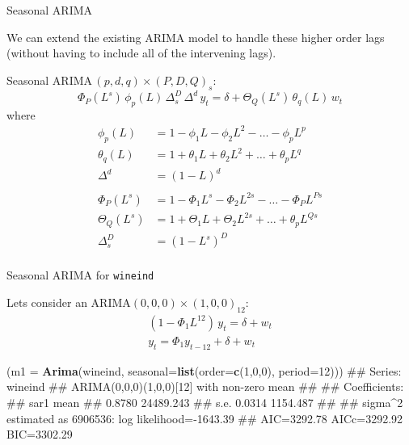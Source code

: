 \documentclass[11pt,ignorenonframetext,]{beamer}
\newenvironment{Shaded}{}{}
\newcommand{\KeywordTok}[1]{\textcolor[rgb]{0.00,0.44,0.13}{\textbf{#1}}}
\newcommand{\DataTypeTok}[1]{\textcolor[rgb]{0.56,0.13,0.00}{#1}}
\newcommand{\DecValTok}[1]{\textcolor[rgb]{0.25,0.63,0.44}{#1}}
\newcommand{\NormalTok}[1]{#1}
\let\oldShaded\Shaded
\let\endoldShaded\endShaded
\renewenvironment{Shaded}{\footnotesize\begin{spacing}{0.9}\oldShaded}{\endoldShaded\end{spacing}}
\begin{document}
\begin{frame}[t]{Seasonal ARIMA}

We can extend the existing ARIMA model to handle these higher order lags
(without having to include all of the intervening lags).

\vspace{3mm}

Seasonal \(\text{ARIMA}\,(p,d,q) \times (P,D,Q)_s\):
\[ \Phi_P(L^s) \, \phi_p(L) \, \Delta_s^D \, \Delta^d \, y_t = \delta + \Theta_Q(L^s) \, \theta_q(L) \, w_t\]
\pause where \[
\begin{aligned}
\phi_p(L) &= 1-\phi_1 L - \phi_2 L^2 - \ldots - \phi_p L^p\\
\theta_q(L) &= 1+\theta_1 L + \theta_2 L^2 + \ldots + \theta_p L^q \\
\Delta^d &= (1-L)^d\\
\\
\Phi_P(L^s) &= 1-\Phi_1 L^s - \Phi_2 L^{2s} - \ldots - \Phi_P L^{Ps} \\
\Theta_Q(L^s) &= 1+\Theta_1 L + \Theta_2 L^{2s} + \ldots + \theta_p L^{Qs} \\
\Delta_s^D &= (1-L^s)^D\\
\end{aligned}
\]

\end{frame}

\begin{frame}[fragile]{Seasonal ARIMA for \texttt{wineind}}

Lets consider an \(\text{ARIMA}(0,0,0) \times (1,0,0)_{12}\): \[
\begin{aligned}
(1-\Phi_1 L^{12}) \, y_t = \delta + w_t \\
y_t = \Phi_1 y_{t-12} + \delta + w_t
\end{aligned}
\] \vspace{2mm}

\begin{Shaded}
\begin{Highlighting}[]
\NormalTok{(}\DataTypeTok{m1 =} \KeywordTok{Arima}\NormalTok{(wineind, }\DataTypeTok{seasonal=}\KeywordTok{list}\NormalTok{(}\DataTypeTok{order=}\KeywordTok{c}\NormalTok{(}\DecValTok{1}\NormalTok{,}\DecValTok{0}\NormalTok{,}\DecValTok{0}\NormalTok{), }\DataTypeTok{period=}\DecValTok{12}\NormalTok{)))}
\NormalTok{## Series: wineind }
\NormalTok{## ARIMA(0,0,0)(1,0,0)[12] with non-zero mean }
\NormalTok{## }
\NormalTok{## Coefficients:}
\NormalTok{##         sar1       mean}
\NormalTok{##       0.8780  24489.243}
\NormalTok{## s.e.  0.0314   1154.487}
\NormalTok{## }
\NormalTok{## sigma^2 estimated as 6906536:  log likelihood=-1643.39}
\NormalTok{## AIC=3292.78   AICc=3292.92   BIC=3302.29}
\end{Highlighting}
\end{Shaded}

\end{frame}
\end{document}
